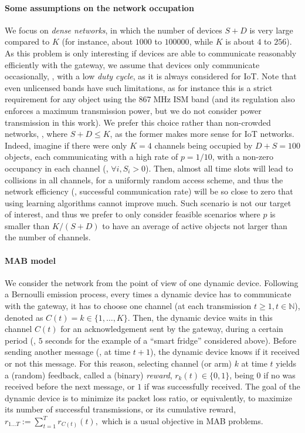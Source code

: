 \paragraph{Some assumptions on the network occupation}
%
We focus on \emph{dense networks}, in which the number of devices $S + D$ is very large compared to $K$ (for instance, about $1000$ to $100000$, while $K$ is about $4$ to $256$).
As this problem is only interesting if devices are able to communicate reasonably efficiently with the gateway, we assume that devices only communicate occasionally, \ie, with a low \emph{duty cycle}, as it is always considered for IoT.
Note that even unlicensed bands have such limitations, as for instance this is a strict requirement for any object using the $867\;\mathrm{MHz}$ ISM band (and its regulation also enforces a maximum transmission power, but we do not consider power transmission in this work).
%
We prefer this choice rather than non-crowded networks, \ie, where $S + D \leq K$, as the former makes more sense for IoT networks.
Indeed, imagine if there were only $K=4$ channels being occupied by $D+S = 100$ objects, each communicating with a high rate of $p=1/10$, with a non-zero occupancy in each channel (\ie, $\forall i, S_i > 0$). Then, almost all time slots will lead to collisions in all channels, for a uniformly random access scheme, and thus the network efficiency (\ie, successful communication rate) will be so close to zero that using learning algorithms cannot improve much.
Such scenario is not our target of interest, and thus we prefer to only consider feasible scenarios where $p$ is smaller than $K/(S+D)$ to have an average of active objects not larger than the number of channels.


\paragraph{MAB model}
%
We consider the network from the point of view of one dynamic device.
Following a Bernoulli emission process, every times a dynamic device has to communicate with the gateway,
it has to choose one channel (at each transmission $t \geq 1, t \in \mathbb{N}$), denoted as $C(t) = k \in\{1,\dots,K\}$.
Then, the dynamic device waits in this channel $C(t)$ for an acknowledgement sent by the gateway, during a certain period (\eg, $5$ seconds for the example of a ``smart fridge'' considered above).
Before sending another message (\ie, at time $t+1$), the dynamic device knows if it received or not this \Ack{} message.
%
For this reason, selecting channel (or arm) $k$ at time $t$ yields a (random) feedback, called a (binary) \emph{reward}, $r_k(t) \in \{0,1\}$, being $0$ if no \Ack{} was received before the next message, or $1$ if \Ack{} was successfully received.
The goal of the dynamic device is to minimize its packet loss ratio, or equivalently, to maximize its number of successful transmissions, or its cumulative reward,
$r_{1 \dots T} := \sum_{t = 1}^T r_{C(t)}(t),$
which is a usual objective in MAB problems.


